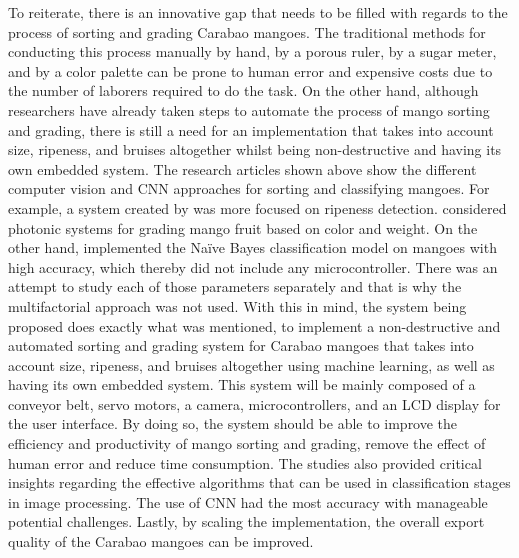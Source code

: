 To reiterate, there is an innovative gap that needs to be filled with regards to the process
of sorting and grading Carabao mangoes. The traditional methods for conducting this
process manually by hand, by a porous ruler, by a sugar meter, and by a color palette can
be prone to human error and expensive costs due to the number of laborers required to
do the task. On the other hand, although researchers have already taken steps to
automate the process of mango sorting and grading, there is still a need for an
implementation that takes into account size, ripeness, and bruises altogether whilst being
non-destructive and having its own embedded system. The research articles shown
above show the different computer vision and CNN approaches for sorting and
classifying mangoes. For example, a system created by \citet{adam-non-destructive-2022} was more
focused on ripeness detection. \citet{school-of-engineering-asia-pacific-college-philippines-carabao-2023} considered photonic systems for
grading mango fruit based on color and weight. On the other hand, \citet{guillermo-determining-2019} implemented the Naïve Bayes classification model on mangoes with high
accuracy, which thereby did not include any microcontroller. There was an attempt to
study each of those parameters separately and that is why the multifactorial approach
was not used. With this in mind, the system being proposed does exactly what was
mentioned, to implement a non-destructive and automated sorting and grading system
for Carabao mangoes that takes into account size, ripeness, and bruises altogether using
machine learning, as well as having its own embedded system. This system will be
mainly composed of a conveyor belt, servo motors, a camera, microcontrollers, and an
LCD display for the user interface. By doing so, the system should be able to improve
the efficiency and productivity of mango sorting and grading, remove the effect of
human error and reduce time consumption. The studies also provided critical insights
regarding the effective algorithms that can be used in classification stages in image
processing. The use of CNN had the most accuracy with manageable potential
challenges. Lastly, by scaling the implementation, the overall export quality of the
Carabao mangoes can be improved.




